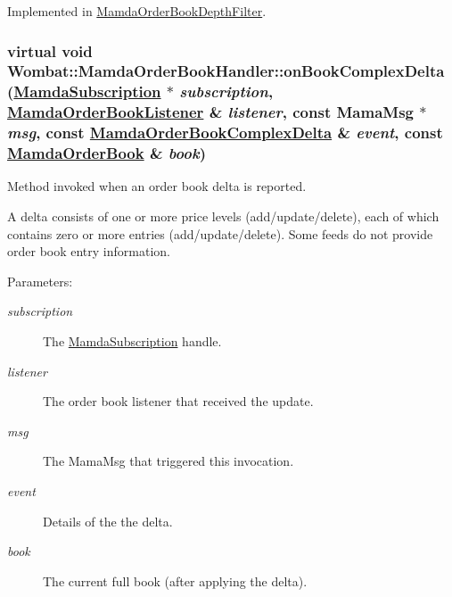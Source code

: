 Implemented in \hyperlink{classMamdaOrderBookDepthFilter_f4fc478bf1306d3eb5af4f0278bfb198}{Mamda\-Order\-Book\-Depth\-Filter}.\hypertarget{classWombat_1_1MamdaOrderBookHandler_eaeaeb1763785a609ba8552960acce8f}{
\subsubsection[onBookComplexDelta]{\setlength{\rightskip}{0pt plus 5cm}virtual void Wombat::Mamda\-Order\-Book\-Handler::on\-Book\-Complex\-Delta (\hyperlink{classWombat_1_1MamdaSubscription}{Mamda\-Subscription} $\ast$ {\em subscription}, \hyperlink{classWombat_1_1MamdaOrderBookListener}{Mamda\-Order\-Book\-Listener} \& {\em listener}, const Mama\-Msg $\ast$ {\em msg}, const \hyperlink{classWombat_1_1MamdaOrderBookComplexDelta}{Mamda\-Order\-Book\-Complex\-Delta} \& {\em event}, const \hyperlink{classWombat_1_1MamdaOrderBook}{Mamda\-Order\-Book} \& {\em book})}}
\label{classWombat_1_1MamdaOrderBookHandler_eaeaeb1763785a609ba8552960acce8f}


Method invoked when an order book delta is reported. 

A delta consists of one or more price levels (add/update/delete), each of which contains zero or more entries (add/update/delete). Some feeds do not provide order book entry information.

\begin{Desc}
\item[Parameters:]
\begin{description}
\item[{\em subscription}]The \hyperlink{classWombat_1_1MamdaSubscription}{Mamda\-Subscription} handle. \item[{\em listener}]The order book listener that received the update. \item[{\em msg}]The Mama\-Msg that triggered this invocation. \item[{\em event}]Details of the the delta. \item[{\em book}]The current full book (after applying the delta). \end{description}
\end{Desc}


